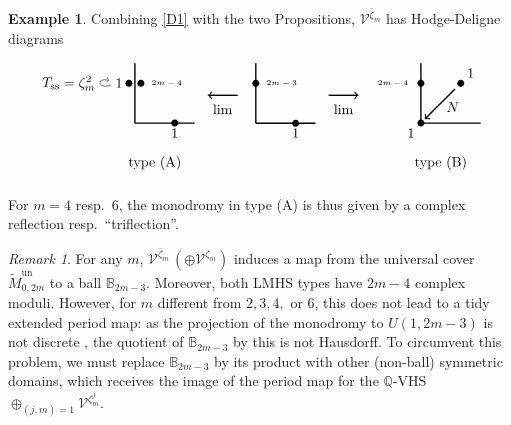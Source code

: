 \documentclass[12pt,letterpaper,english]{amsart}
\numberwithin{equation}{section}
\numberwithin{figure}{section}
\theoremstyle{plain}
\theoremstyle{remark}
\newtheorem{rem}[equation]{Remark}
\theoremstyle{definition}
\theoremstyle{definition}
\newtheorem{example}[equation]{Example}
\theoremstyle{plain}
\theoremstyle{plain}
\theoremstyle{plain}
\theoremstyle{plain}
\theoremstyle{definition}
\def\QQ{\mathbb{Q}}
\def\V{\mathcal{V}}
\def\BB{\mathbb{B}}
\theoremstyle{definition}
\begin{document}
\begin{example}
Combining \eqref{D1} with the two Propositions, $\V^{\bar{\zeta}_m}$ has Hodge-Deligne diagrams

\begin{align*}
\begin{tikzpicture}[scale=0.5]
   	\node at (-0.8,2) (foo) {$1$};
    \path[->] (foo) edge  [loop left] node {$T_{\text{ss}}=\zeta_m^2$} ();
    \draw[-,line width=1.0pt] (0,0) -- (0,3);
    \draw[-,line width=1.0pt] (0,0) -- (3,0);
	\fill (2,0) circle (5pt);
	\node at (2,-0.5)  {$1$};		
	\fill (-0.3,2) circle (5pt);
	\fill (0.3,2) circle (5pt);	
	\node at (1.6,2) {\tiny$2m-4$};
	\node at (1,-2) {type (A)};	\end{tikzpicture}
& 
\begin{tikzpicture}[scale=0.5]
\draw[->,line width=1.0pt] (1.5,3.5) -- (0,3.5);
\node at (0.75,2.8) {$\lim$};
\node at (0,0) {\phantom{hh}};
\end{tikzpicture} 
&
\begin{tikzpicture}[scale=0.5]
    \draw[-,line width=1.0pt] (0,0) -- (0,3);
    \draw[-,line width=1.0pt] (0,0) -- (3,0);
	\fill (2,0) circle (5pt);
	\fill (0,2) circle (5pt);		
	\node at (2,-0.5) {$1$};
	\node at (1.3,2) {\tiny$2m-3$};
	\node at (1,-2) {\phantom{$\V^{\bar{\zeta}_m}$}};				
\end{tikzpicture}
& 
\begin{tikzpicture}[scale=0.5]
\draw[->,line width=1.0pt] (0,3.5) -- (1.5,3.5);
\node at (0.75,2.8) {$\lim$};
\node at (0,0) {\phantom{hh}};
\end{tikzpicture} 
&
\begin{tikzpicture}[scale=0.5]
   	\node at (1.6,0.8) (foo) {$N$};
    \draw[-,line width=1.0pt] (0,0) -- (0,3);
    \draw[-,line width=1.0pt] (0,0) -- (3,0);
    \draw[->,line width=1.0pt] (1.7, 1.7) -- (0.2,0.2);
	\fill (0,2) circle (5pt);
	\fill (0,0) circle (5pt);	
	\node at (2.5,2.5) {$1$};	
	\fill (2,2) circle (5pt);
	\node at (-1.4,2) {\tiny$2m-4$};		\node at (-0.5,-0.5) {$1$};
	\node at (1,-2) {type (B)};
\end{tikzpicture}
\end{align*}


\noindent For $m=4$ resp.~$6$, the monodromy in type (A) is thus given by a complex reflection resp.~``triflection''.
\end{example}

\begin{rem}\label{D7}
For any $m$, $\V^{\bar{\zeta}_m}\,(\oplus \V^{\zeta_m})$ induces a map from the universal cover $\widetilde{M}_{0,2m}^{\text{un}}$ to a ball $\BB_{2m-3}$. Moreover, both LMHS types have $2m-4$ complex moduli. However, for $m$ different from $2,3,4,$ or $6$, this does not lead to a tidy extended period map: as the projection of the monodromy to $U(1,2m-3)$ is not discrete \cite{Mo}, the quotient of $\BB_{2m-3}$ by this is not Hausdorff. To circumvent this problem, we must replace $\BB_{2m-3}$ by its product with other (non-ball) symmetric domains, which receives the image of the period map for the $\QQ$-VHS $\oplus_{(j,m)=1}\V^{\zeta_m^j}$.
\end{rem}
\end{document}
